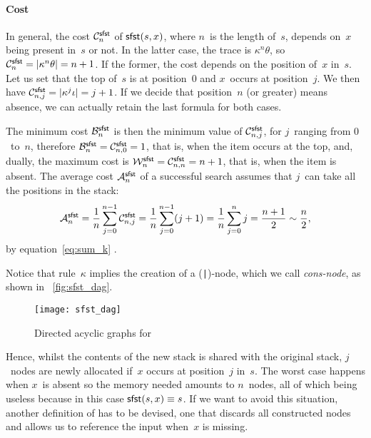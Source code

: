 \paragraph{Cost}

In general, the cost
\(\C{\fun{sfst}}{n}\) of
\(\fun{sfst}(s,x)\), where \(n\)~is the length of~\(s\), depends
on~\(x\) being present in~\(s\) or not. In the latter case, the trace
is \(\kappa^n\theta\), so \(\C{\fun{sfst}}{n} = \len{\kappa^n\theta} =
n + 1\). If the former, the cost depends on the position of~\(x\)
in~\(s\). Let us set that the top of~\(s\) is at position~\(0\) and
\(x\)~occurs at position~\(j\). We then have \(\C{\fun{sfst}}{n,j} =
\len{\kappa^j\iota} = j + 1\). If we
decide that position~\(n\) (or greater) means absence, we can actually
retain the last formula for both cases.

The minimum cost \(\B{\fun{sfst}}{n}\)
is then the minimum value
of \(\C{\fun{sfst}}{n,j}\), for \(j\)~ranging from \(0\)~to~\(n\),
therefore \(\B{\fun{sfst}}{n} = \C{\fun{sfst}}{n,0} = 1\), that is,
when the item occurs at the top, and, dually, the maximum
cost
is \(\W{\fun{sfst}}{n} =
\C{\fun{sfst}}{n,n} = n + 1\), that is, when the item is absent. The
average cost
\(\M{\fun{sfst}}{n}\) of a successful search assumes that \(j\)~can
take all the positions in the stack:
\begin{equation*}
  \M{\fun{sfst}}{n} = \frac{1}{n}\sum_{j=0}^{n-1}\C{\fun{sfst}}{n,j} =
  \frac{1}{n}\sum_{j=0}^{n-1}(j+1) = \frac{1}{n}\sum_{j=0}^{n}j
  = \frac{n+1}{2} \sim \frac{n}{2},
\end{equation*}
by equation~\eqref{eq:sum_k} .

Notice that rule~\(\kappa\) implies the creation of a
(\texttt{|})\hyp{}node, which we call
\emph{cons\hyp{}node}, as shown in
\fig~\vref{fig:sfst_dag}.
\begin{figure}
\centering
\texttt{[image: sfst\_dag]}
\caption{Directed acyclic graphs for 
\label{fig:sfst_dag}}
\end{figure}
Hence, whilst the contents of the new stack is shared with the
original stack, \(j\)~nodes are newly allocated if~\(x\) occurs at
position~\(j\) in~\(s\). The worst case happens when \(x\)~is absent
so the memory needed amounts to
\(n\)~nodes, all of which being useless because in this case
\(\fun{sfst}(s,x) \equiv s\). If we want to avoid this situation,
another definition of  has to be devised, one that
discards all constructed nodes and allows us to reference the input
when~\(x\) is missing.

